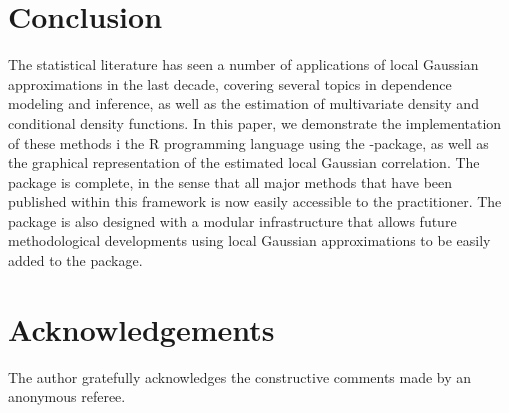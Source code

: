 \section{Conclusion} 

The statistical literature has seen a number of applications of local Gaussian approximations in the last decade, covering several topics in dependence modeling and inference, as well as the estimation of multivariate density and conditional density functions. In this paper, we demonstrate the implementation of these methods i the R programming language using the -package, as well as the graphical representation of the estimated local Gaussian correlation. The package is complete, in the sense that all major methods that have been published within this framework is now easily accessible to the practitioner. The package is also designed with a modular infrastructure that allows future methodological developments using local Gaussian approximations to be easily added to the package. 

\section{Acknowledgements}

The author gratefully acknowledges the constructive comments made by an anonymous referee.



\address{H{\aa}kon Otneim\\
  Department of Business and Management Science, \\
  NHH Norwegian School of Economics, \\
  Helleveien 30, 5045 BERGEN\\
  Norway\\
  }

